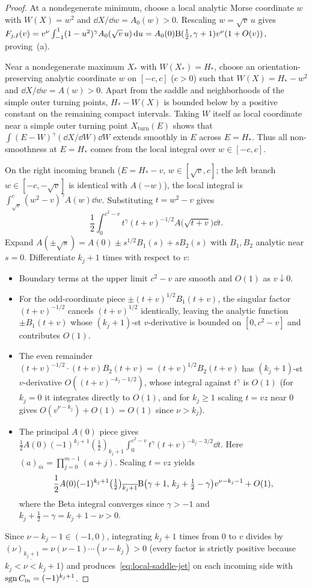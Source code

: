 \begin{proof}
At a nondegenerate minimum, choose a local analytic Morse coordinate $w$ with $W(X)=w^2$ and $\dd X/\dd w = A_0(w)>0$. Rescaling $w=\sqrt{v}\,u$ gives $F_{j,I}(v)=v^\nu\int_{-1}^1 (1-u^2)^\gamma A_0(\sqrt{v}\,u)\,\mathrm{d} u = A_0(0)\mathrm{B}(\tfrac{1}{2},\gamma+1)v^\nu(1+O(v))$, proving~(a).

Near a nondegenerate maximum $X_*$ with $W(X_*)=H_*$, choose an orientation-preserving analytic coordinate $w$ on $[-c,c]$ ($c>0$) such that $W(X)=H_*-w^2$ and $\dd X/\dd w = A(w)>0$. Apart from the saddle and neighborhoods of the simple outer turning points, $H_*-W(X)$ is bounded below by a positive constant on the remaining compact intervals. Taking $W$ itself as local coordinate near a simple outer turning point $X_{\mathrm{turn}}(E)$ shows that $\int (E-W)^\gamma (\dd X/\dd W)\dd W$ extends smoothly in $E$ across $E=H_*$. Thus all non-smoothness at $E=H_*$ comes from the local integral over $w\in[-c,c]$.

On the right incoming branch ($E=H_*-v$, $w\in[\sqrt{v},c]$; the left branch $w\in[-c,-\sqrt{v}]$ is identical with $A(-w)$), the local integral is $\int_{\sqrt{v}}^c (w^2-v)^\gamma A(w)\dd w$. Substituting $t=w^2-v$ gives
\[
  \frac{1}{2}\int_0^{c^2-v} t^\gamma (t+v)^{-1/2} A\bigl(\sqrt{t+v}\bigr)\dd t.
\]
Expand $A(\pm\sqrt{s})=A(0)\pm s^{1/2}B_1(s)+s B_2(s)$ with $B_1,B_2$ analytic near $s=0$. Differentiate $k_j+1$ times with respect to $v$:
\begin{itemize}[nosep]
  \item Boundary terms at the upper limit $c^2-v$ are smooth and $O(1)$ as $v\downarrow 0$.
  \item For the odd-coordinate piece $\pm(t+v)^{1/2}B_1(t+v)$, the singular factor $(t+v)^{-1/2}$ cancels $(t+v)^{1/2}$ identically, leaving the analytic function $\pm B_1(t+v)$ whose $(k_j+1)$-st $v$-derivative is bounded on $[0,c^2-v]$ and contributes $O(1)$.
  \item The even remainder $(t+v)^{-1/2}\cdot(t+v)B_2(t+v)=(t+v)^{1/2}B_2(t+v)$ has $(k_j+1)$-st $v$-derivative $O((t+v)^{-k_j-1/2})$, whose integral against $t^\gamma$ is $O(1)$ (for $k_j=0$ it integrates directly to $O(1)$, and for $k_j\ge 1$ scaling $t=vz$ near $0$ gives $O(v^{\nu-k_j})+O(1)=O(1)$ since $\nu>k_j$).
  \item The principal $A(0)$ piece gives $\frac{1}{2}A(0)(-1)^{k_j+1}(\tfrac{1}{2})_{\overline{k_j+1}}\int_0^{c^2-v} t^\gamma(t+v)^{-k_j-3/2}\dd t$. Here \((a)_{\overline m}=\prod_{j=0}^{m-1}(a+j)\). Scaling $t=vz$ yields
  \[
    \frac{1}{2}A(0)(-1)^{k_j+1}\bigl(\tfrac{1}{2}\bigr)_{\overline{k_j+1}}\mathrm{B}\bigl(\gamma+1,\,k_j+\tfrac{1}{2}-\gamma\bigr)v^{\nu-k_j-1} + O(1),
  \]
  where the Beta integral converges since $\gamma>-1$ and $k_j+\frac{1}{2}-\gamma=k_j+1-\nu>0$.
\end{itemize}
Since $\nu-k_j-1\in(-1,0)$, integrating $k_j+1$ times from $0$ to $v$ divides by $(\nu)_{\underline{k_j+1}}=\nu(\nu-1)\cdots(\nu-k_j)>0$ (every factor is strictly positive because $k_j<\nu<k_j+1$) and produces~\eqref{eq:local-saddle-jet} on each incoming side with $\operatorname{sgn} C_{\mathrm{in}}=(-1)^{k_j+1}$.


\end{proof}
